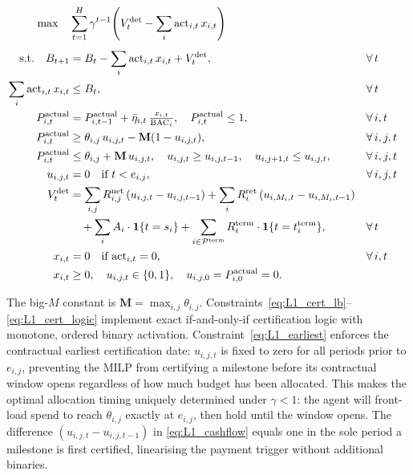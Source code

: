 \begin{subequations}
\label{eq:L1}
\begin{align}
  \max \quad
  & \sum_{t=1}^{H} \gamma^{t-1}\!\left(
      V_t^{\mathrm{det}}
      - \sum_{i} \mathrm{act}_{i,t}\, x_{i,t}
    \right)
  \label{eq:L1_obj} \\[4pt]
  \text{s.t.} \quad
  B_{t+1}
    &= B_t - \sum_i \mathrm{act}_{i,t}\,x_{i,t} + V_t^{\mathrm{det}},
    && \forall\, t
  \label{eq:L1_balance} \\
  \sum_i \mathrm{act}_{i,t}\, x_{i,t}
    &\leq B_t,
    && \forall\, t
  \label{eq:L1_budget} \\
  P_{i,t}^{\mathrm{actual}}
    &= P_{i,t-1}^{\mathrm{actual}}
       + \bar{\eta}_{i,t}\,\tfrac{x_{i,t}}{\mathrm{BAC}_i},
    \quad P_{i,t}^{\mathrm{actual}} \leq 1,
    && \forall\, i,t
  \label{eq:L1_progress} \\
  P_{i,t}^{\mathrm{actual}}
    &\geq \theta_{i,j}\,u_{i,j,t}
       - \mathbf{M}(1 - u_{i,j,t}),
    && \forall\, i,j,t
  \label{eq:L1_cert_lb} \\
  P_{i,t}^{\mathrm{actual}}
    &\leq \theta_{i,j} + \mathbf{M}\,u_{i,j,t},
    \quad u_{i,j,t} \geq u_{i,j,t-1},
    \quad u_{i,j+1,t} \leq u_{i,j,t},
    && \forall\, i,j,t
  \label{eq:L1_cert_logic} \\
  u_{i,j,t}
    &= 0
    \quad \text{if } t < e_{i,j},
    && \forall\, i,j,t
  \label{eq:L1_earliest} \\
  V_t^{\mathrm{det}}
    &= \sum_{i,j} R_{i,j}^{\mathrm{net}}\,(u_{i,j,t} - u_{i,j,t-1})
       + \sum_i R_i^{\mathrm{ret}}\,
           (u_{i,M_i,t} - u_{i,M_i,t-1})
       \notag \\
    &\quad
       + \sum_i A_i \cdot \mathbf{1}\{t = s_i\}
       + \sum_{i \in \mathcal{P}^{\mathrm{term}}}
           R_i^{\mathrm{term}}
           \cdot \mathbf{1}\{t = t_i^{\mathrm{term}}\},
    && \forall\, t
  \label{eq:L1_cashflow} \\
  x_{i,t}
    &= 0 \quad \text{if } \mathrm{act}_{i,t} = 0,
    && \forall\, i,t
  \label{eq:L1_inactive} \\
  x_{i,t} &\geq 0,
    \quad u_{i,j,t} \in \{0,1\},
    \quad u_{i,j,0} = P_{i,0}^{\mathrm{actual}} = 0.
  \label{eq:L1_domains}
\end{align}
\end{subequations}

The big-$M$ constant is $\mathbf{M} = \max_{i,j}\theta_{i,j}$.
Constraints~\eqref{eq:L1_cert_lb}--\eqref{eq:L1_cert_logic} implement
exact if-and-only-if certification logic with monotone, ordered binary
activation. Constraint~\eqref{eq:L1_earliest} enforces the contractual
earliest certification date: $u_{i,j,t}$ is fixed to zero for all
periods prior to $e_{i,j}$, preventing the MILP from certifying a
milestone before its contractual window opens regardless of how much
budget has been allocated. This makes the optimal allocation timing
uniquely determined under $\gamma < 1$: the agent will front-load
spend to reach $\theta_{i,j}$ exactly at $e_{i,j}$, then hold until
the window opens. The difference $(u_{i,j,t} - u_{i,j,t-1})$ in
\eqref{eq:L1_cashflow} equals one in the sole period a milestone is
first certified, linearising the payment trigger without additional
binaries.

